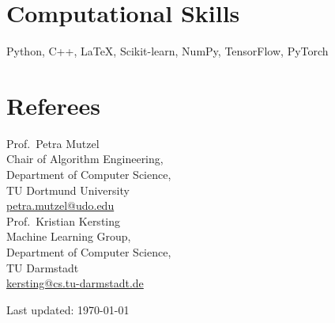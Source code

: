 \documentclass[11pt, a4paper]{scrartcl}
\begin{document}
\section*{Computational Skills}
Python, C++, \LaTeX, Scikit-learn, NumPy, TensorFlow, PyTorch

\section*{Referees}
Prof.~Petra Mutzel\\
Chair of Algorithm Engineering,\\ 
Department of Computer Science,\\
TU Dortmund University\\
\href{mailto:petra.mutzel@udo.edu}{petra.mutzel@udo.edu}\\


Prof.~Kristian Kersting\\ 
Machine Learning Group,\\
Department of Computer Science,\\
TU Darmstadt\\
\href{mailto:kersting@cs.tu-darmstadt.de}{kersting@cs.tu-darmstadt.de}\\

\vfill{} 
\begin{center}
{\scriptsize Last updated: \today}
\end{center}
\end{document}
